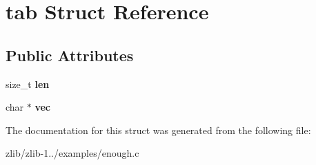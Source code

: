 \hypertarget{structtab}{\section{tab Struct Reference}
\label{structtab}
}
\subsection*{Public Attributes}
\begin{DoxyCompactItemize}
\item 
\hypertarget{structtab_a7f06b129361240fd161e92a1043df401}{size\+\_\+t {\bfseries len}}\label{structtab_a7f06b129361240fd161e92a1043df401}

\item 
\hypertarget{structtab_a855a164238faa032b6d0c15829bff34f}{char $\ast$ {\bfseries vec}}\label{structtab_a855a164238faa032b6d0c15829bff34f}

\end{DoxyCompactItemize}


The documentation for this struct was generated from the following file\+:\begin{DoxyCompactItemize}
\item 
zlib/zlib-\/1../examples/enough.\+c\end{DoxyCompactItemize}

